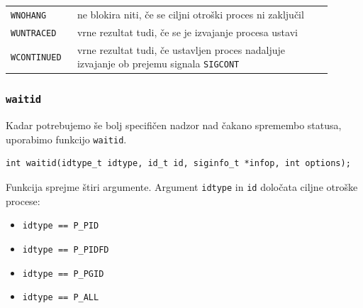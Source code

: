 \documentclass[a4paper,12pt,openright]{book}
\begin{document}
\begin{tabular}{ p{0.18\linewidth} p{0.72\linewidth} }
	\texttt{WNOHANG}    & ne blokira niti, če se ciljni otroški proces ni zaključil                                     \\
	\texttt{WUNTRACED}  & vrne rezultat tudi, če se je izvajanje procesa ustavi                                           \\
	\texttt{WCONTINUED} & vrne rezultat tudi, če ustavljen proces nadaljuje izvajanje ob prejemu signala \texttt{SIGCONT} 
\end{tabular}

\subsubsection{\texttt{waitid}}

Kadar potrebujemo še bolj specifičen nadzor nad čakano spremembo statusa, uporabimo funkcijo \texttt{waitid}.

\begin{lstlisting}[style=func]
	int waitid(idtype_t idtype, id_t id, siginfo_t *infop, int options);
\end{lstlisting}

Funkcija sprejme štiri argumente.
Argument \texttt{idtype} in \texttt{id} določata ciljne otroške procese:
\begin{itemize}
	\item \texttt{idtype == P\_PID}
	\item \texttt{idtype == P\_PIDFD}
	\item \texttt{idtype == P\_PGID}
	\item \texttt{idtype == P\_ALL}
\end{itemize}
\end{document}
